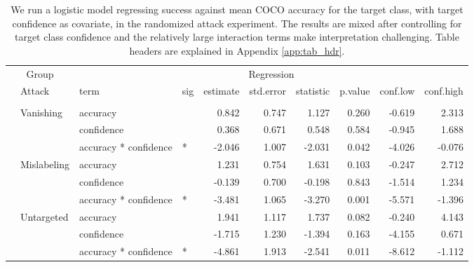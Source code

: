 \documentclass[
]{article}
\begin{document}
\begin{longtable}[t]{llllrrrrrr}
\caption{\label{tab:target_success_table}We run a logistic model regressing success against mean COCO accuracy for the target class, with target confidence as covariate, in the randomized attack experiment. The results are mixed after controlling for target class confidence and the relatively large interaction terms make interpretation challenging. Table headers are explained in Appendix \ref{app:tab_hdr}.}\\
\toprule
\multicolumn{2}{c}{Group} & \multicolumn{8}{c}{Regression} \\
\cmidrule(l{3pt}r{3pt}){1-2} \cmidrule(l{3pt}r{3pt}){3-10}
 & Attack & term & sig & estimate & std.error & statistic & p.value & conf.low & conf.high\\
\midrule
\addlinespace[0.3em]
\multicolumn{10}{l}{\textbf{YOLOv3}}\\
\hspace{1em} & Vanishing & accuracy &  & 0.842 & 0.747 & 1.127 & 0.260 & -0.619 & 2.313\\
\cmidrule{3-10}\nopagebreak
\hspace{1em} &  & confidence &  & 0.368 & 0.671 & 0.548 & 0.584 & -0.945 & 1.688\\
\cmidrule{3-10}\nopagebreak
\hspace{1em} &  & accuracy * confidence & * & -2.046 & 1.007 & -2.031 & 0.042 & -4.026 & -0.076\\
\cmidrule{2-10}\nopagebreak
\hspace{1em} & Mislabeling & accuracy &  & 1.231 & 0.754 & 1.631 & 0.103 & -0.247 & 2.712\\
\cmidrule{3-10}\nopagebreak
\hspace{1em} &  & confidence &  & -0.139 & 0.700 & -0.198 & 0.843 & -1.514 & 1.234\\
\cmidrule{3-10}\nopagebreak
\hspace{1em} &  & accuracy * confidence & * & -3.481 & 1.065 & -3.270 & 0.001 & -5.571 & -1.396\\
\cmidrule{2-10}\nopagebreak
\hspace{1em} & Untargeted & accuracy &  & 1.941 & 1.117 & 1.737 & 0.082 & -0.240 & 4.143\\
\cmidrule{3-10}\nopagebreak
\hspace{1em} &  & confidence &  & -1.715 & 1.230 & -1.394 & 0.163 & -4.155 & 0.671\\
\cmidrule{3-10}\nopagebreak
\hspace{1em} &  & accuracy * confidence & * & -4.861 & 1.913 & -2.541 & 0.011 & -8.612 & -1.112\\

\end{longtable}
\end{document}
